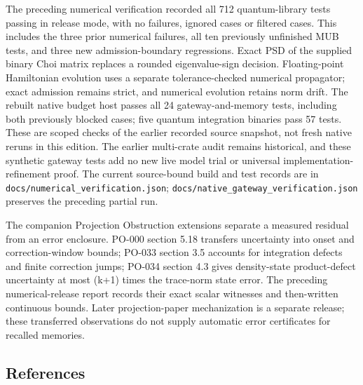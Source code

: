 \documentclass[
  10pt,
]{article}
\begin{document}
The preceding numerical verification recorded all 712 quantum-library tests passing in release mode, with no failures, ignored cases or filtered cases. This includes the three prior numerical failures, all ten previously unfinished MUB tests, and three new admission-boundary regressions. Exact PSD of the supplied binary Choi matrix replaces a rounded eigenvalue-sign decision. Floating-point Hamiltonian evolution uses a separate tolerance-checked numerical propagator; exact admission remains strict, and numerical evolution retains norm drift. The rebuilt native budget host passes all 24 gateway-and-memory tests, including both previously blocked cases; five quantum integration binaries pass 57 tests. These are scoped checks of the earlier recorded source snapshot, not fresh native reruns in this edition. The earlier multi-crate audit remains historical, and these synthetic gateway tests add no new live model trial or universal implementation-refinement proof. The current source-bound build and test records are in \texttt{docs/numerical\_verification.json}; \texttt{docs/native\_gateway\_verification.json} preserves the preceding partial run.

The companion Projection Obstruction extensions separate a measured residual from an error enclosure. PO-000 section 5.18 transfers uncertainty into onset and correction-window bounds; PO-033 section 3.5 accounts for integration defects and finite correction jumps; PO-034 section 4.3 gives density-state product-defect uncertainty at most (k+1) times the trace-norm state error. The preceding numerical-release report records their exact scalar witnesses and then-written continuous bounds. Later projection-paper mechanization is a separate release; these transferred observations do not supply automatic error certificates for recalled memories.

\subsection{References}\label{references}
\end{document}
